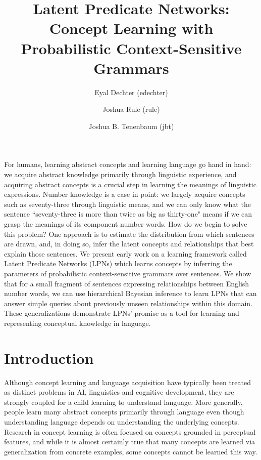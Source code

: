 \documentclass[10pt, twocolumn]{article}
\title{Latent Predicate Networks: Concept Learning with Probabilistic Context-Sensitive Grammars}
\author{Eyal Dechter (edechter)}
\author{Joshua Rule (rule)}
\author{Joshua B. Tenenbaum (jbt)}
\affil{Department of Brain and Cognitive Sciences, MIT (mit.edu)}
\date{}
\begin{document}
\vspace{-10cm}
\maketitle

\vspace{-6em}


{\small For humans, learning abstract concepts and learning language
  go hand in hand: we acquire abstract knowledge primarily through
  linguistic experience, and acquiring abstract concepts is a crucial
  step in learning the meanings of linguistic expressions. Number
  knowledge is a case in point: we largely acquire concepts such as
  seventy-three through linguistic means, and we can only know what
  the sentence ``seventy-three is more than twice as big as
  thirty-one" means if we can grasp the meanings of its component
  number words. How do we begin to solve this problem? One approach is
  to estimate the distribution from which sentences are drawn, and, in
  doing so, infer the latent concepts and relationships that best
  explain those sentences. We present early work on a learning
  framework called Latent Predicate Networks (LPNs) which learns
  concepts by inferring the parameters of probabilistic
  context-sensitive grammars over sentences.  We show that for a small
  fragment of sentences expressing relationships between English
  number words, we can use hierarchical Bayesian inference to learn
  LPNs that can answer simple queries about previously unseen
  relationships within this domain. These generalizations demonstrate
  LPNs' promise as a tool for learning and representing conceptual
  knowledge in language.}

\section{Introduction}

Although concept learning and language acquisition have typically been
treated as distinct problems in AI, linguistics and cognitive
development, they are strongly coupled for a child learning to
understand language. More generally, people learn many abstract
concepts primarily through language even though understanding language
depends on understanding the underlying concepts. Research in concept
learning is often focused on concepts grounded in perceptual features,
and while it is almost certainly true that many concepts are learned
via generalization from concrete examples, some concepts cannot be
learned this way.
\end{document}
